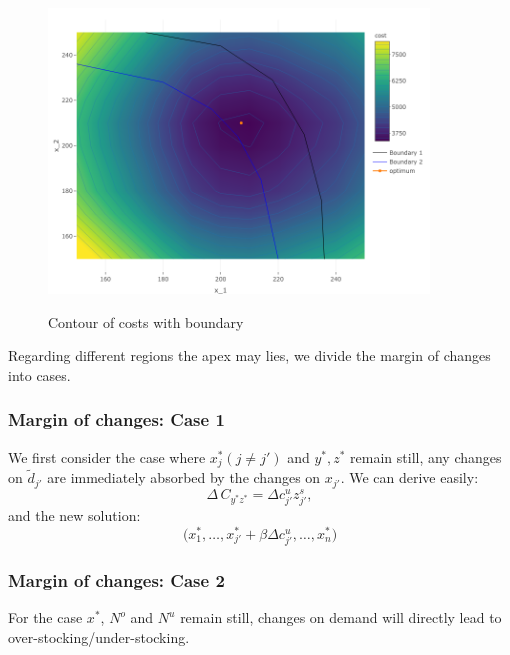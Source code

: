 \documentclass[a4paper,11pt]{article}
\begin{document}
\begin{figure}[ht]
\caption{Contour of costs with boundary}
\hspace{1cm}
\includegraphics[width=0.9\textwidth]{Example-figure_files/figure-latex/contour.png}
\label{fig:con}
\end{figure}


Regarding different regions the apex may lies, we divide the margin of changes into cases.

\subsubsection*{Margin of changes: Case 1}
We first consider the case where $x_j^*(j \neq j')$ and $y^*,z^*$ remain still, any changes on $\tilde{d}_{j'}$ are immediately absorbed by the changes on $x_{j'}$. We can derive easily:
\[
    \Delta \, C_{y^*z^*} = \Delta c_{j'}^u z_{j'}^s,
\]
and the new solution:
\[
\big( x_1^*,\dots,x_{j'}^*+\beta \Delta c_{j'}^u,\dots,x_n^*  \big)
\]

\subsubsection*{Margin of changes: Case 2}
For the case $x^*$, $N^o$ and $N^u$ remain still, changes on demand will directly lead to over-stocking/under-stocking.
\end{document}
